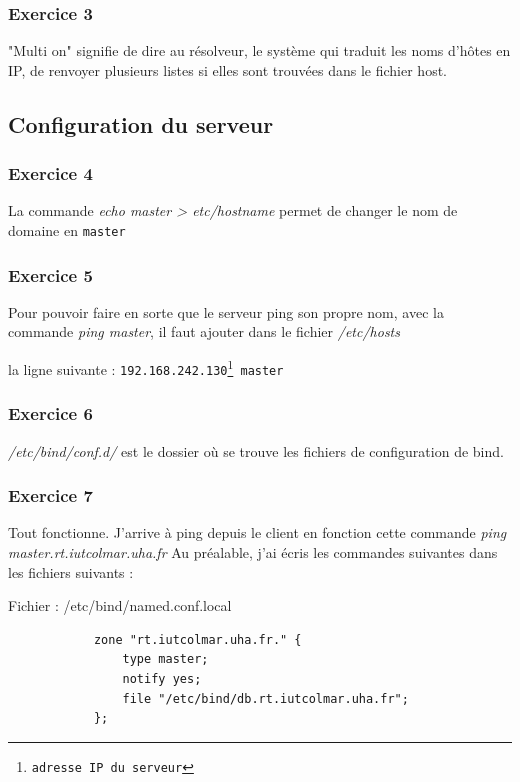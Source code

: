 \documentclass[12pt, a4paper]{article}
\begin{document}
        \subsubsection{Exercice 3}
        "Multi on" signifie de dire au résolveur, le système qui traduit les noms 
        d'hôtes en IP, de renvoyer plusieurs listes si elles sont trouvées dans 
        le fichier host. 

    \subsection{Configuration du serveur}
        \subsubsection{Exercice 4}
        La commande \textit{echo master > etc/hostname} permet de changer le nom
        de domaine en \texttt{master}
        \subsubsection{Exercice 5}
        Pour pouvoir faire en sorte que le serveur ping son propre nom, avec la commande 
        \textit{ping master}, il faut ajouter dans le fichier \textit{/etc/hosts}
    
        la ligne suivante : \texttt{192.168.242.130\footnote{adresse IP du serveur} master}
        \subsubsection{Exercice 6}
        \textit{/etc/bind/conf.d/} est le dossier où se trouve les fichiers de 
        configuration de bind. 

        \newpage
        \subsubsection{Exercice 7}
        Tout fonctionne. J'arrive à ping depuis le client en fonction cette commande
        \textit{ping master.rt.iutcolmar.uha.fr} 
        Au préalable, j'ai écris les commandes suivantes dans les fichiers suivants :

        \begin{listing}[H]
            \caption{Fichier : /etc/bind/named.conf.local}
            \label{lst:named}
            \begin{verbatim}
            zone "rt.iutcolmar.uha.fr." {
                type master;
                notify yes;
                file "/etc/bind/db.rt.iutcolmar.uha.fr";
            };
            \end{verbatim}
        \end{listing}
\end{document}
